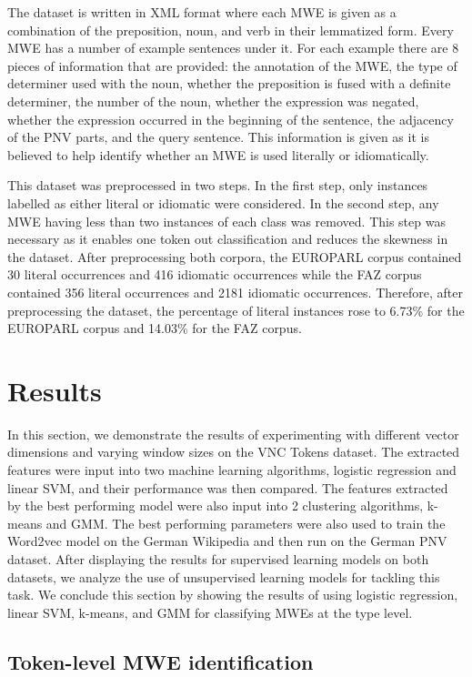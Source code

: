 \documentclass[11pt]{article}
\begin{document}
The dataset is written in XML format where each MWE is given as a combination of the preposition, noun, and verb in their lemmatized form. Every MWE has a number of example sentences under it. For each example there are 8 pieces of information that are provided: the annotation of the MWE, the type of determiner used with the noun, whether the preposition is fused with a definite determiner, the number of the noun, whether the expression was negated, whether the expression occurred in the beginning of the sentence, the adjacency of the PNV parts, and the query sentence. This information is given as it is believed to help identify whether an MWE is used literally or idiomatically.

This dataset was  preprocessed in two steps. In the first step, only instances labelled as either literal or idiomatic were considered. In the second step, any MWE having less than two instances of each class was removed. This step was necessary as it enables one token out classification and reduces the skewness in the dataset. After preprocessing both corpora, the EUROPARL corpus contained 30 literal occurrences and 416 idiomatic occurrences while the FAZ corpus contained 356 literal occurrences and 2181 idiomatic occurrences. Therefore, after preprocessing the dataset, the percentage of literal instances rose to 6.73\% for the EUROPARL corpus and 14.03\% for the FAZ corpus.  

\section{Results}

In this section, we demonstrate the results of experimenting with different vector dimensions and varying window sizes on the VNC Tokens dataset. The extracted features were input into two machine learning algorithms, logistic regression and linear SVM, and their performance was then compared. The features extracted by the best performing model were also input into 2 clustering algorithms, k-means and GMM. The best performing parameters were also used to train the Word2vec model on the German Wikipedia and then run on the German PNV dataset. After displaying the results for supervised learning models on both datasets, we analyze the use of unsupervised learning models for tackling this task. We conclude this section by showing the results of using logistic regression, linear SVM, k-means, and GMM for classifying MWEs at the type level. 

\subsection{Token-level MWE identification}
\end{document}
